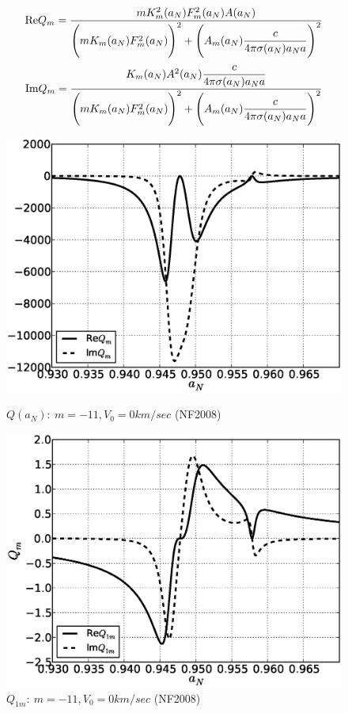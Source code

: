 \documentclass[11pt,oneside,a4paper,notitlepage]{article}
\begin{document}
\begin{equation}\label{eq:Q:r}
 \textnormal{Re}Q_m=\frac{mK_m^2(a_N)F_m^2(a_N)A(a_N)}{\\
 \Bigg(mK_m(a_N)F_m^2(a_N)\Bigg)^2+\Bigg(A_m(a_N)\dfrac{c}{4\pi\sigma(a_N)a_Na}\Bigg)^2}
\end{equation}
\begin{equation}\label{eq:Q:i}
 \textnormal{Im}Q_m=\frac{K_m(a_N)A^2(a_N)\dfrac{c}{4\pi\sigma(a_N)a_Na} }{\\
 \Bigg(mK_m(a_N)F_m^2(a_N)\Bigg)^2+\Bigg(A_m(a_N)\dfrac{c}{4\pi\sigma(a_N)a_Na}\Bigg)^2}
\end{equation}
\begin{figure}[h]
\begin{center}
\begin{minipage}[h]{0.4\linewidth}
 \includegraphics[width=1.35\linewidth]{Q.eps}
 \caption{$Q(a_N):~m=-11,V_{0}=0km/sec$ (NF2008)}
 \label{fig:Q}
\end{minipage}
\hfill
\begin{minipage}[h]{0.4\linewidth}
 \includegraphics[width=1.35\linewidth]{Q1.eps}
 \caption{$Q_{1m}:~m=-11,V_{0}=0km/sec$ (NF2008)}
 \label{fig:Q1}
\end{minipage}
\end{center}
\end{figure}
\end{document}

